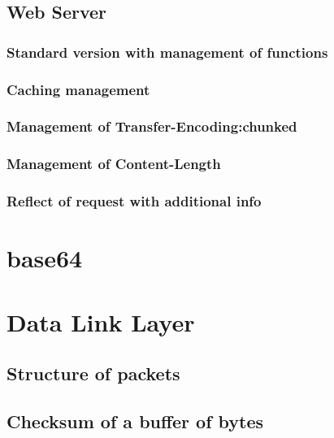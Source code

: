 \subsection{Web Server}
\subsubsection{Standard version with management of functions}

\clearpage
\subsubsection{Caching management}

\clearpage
\subsubsection{Management of Transfer-Encoding:chunked}

\clearpage
\subsubsection{Management of Content-Length}

\clearpage
\subsubsection{Reflect of request with additional info}

\clearpage
\section{base64}

\clearpage
\section{Data Link Layer}
\subsection{Structure of packets}

\clearpage
\subsection{Checksum of a buffer of bytes}

\clearpage
